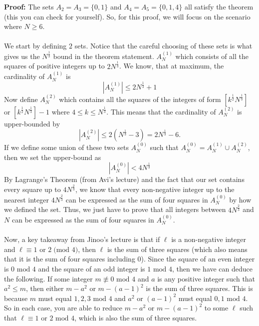 \begin{boxedsection}
    \textbf{Proof:} The sets $A_2 = A_3 = \{0, 1\}$ and $A_4 = A_5 = \{0,1,4\}$ all satisfy the theorem (this you can check for yourself). So, for this proof, we will focus on the scenario where $N \geq 6$. \\
    \\
    We start by defining $2$ sets. Notice that the careful choosing of these sets is what gives us the $N^{\frac{1}{3}}$ bound in the theorem statement. $A_N^{(1)}$ which consists of all the squares of positive integers up to $2N^{\frac{1}{3}}$. We know, that at maximum, the cardinality of $A_N^{(1)}$ is
    $$
    |A_N^{(1)}| \leq 2N^{\frac{1}{3}} + 1
    $$
Now define $A^{(2)}_N$ which contains all the squares of the integers of form $\left[k^{\frac{1}{2}}N^{\frac{1}{3}}\right]$ or $\left[k^{\frac{1}{2}}N^{\frac{1}{3}}\right] - 1$ where $4 \leq k \leq N^{\frac{1}{3}}$. This means that the cardinality of $A^{(2)}_N$ is upper-bounded by
    $$
    |A^{(2)}_N| \leq 2(N^{\frac{1}{3}} - 3) = 2N^{\frac{1}{3}} - 6. 
    $$
    If we define some union of these two sets $A^{(0)}_N$ such that $A^{(0)}_N = A^{(1)}_N \cup A^{(2)}_N$, then we set the upper-bound as
$$
    |A^{(0)}_N| < 4N^{\frac{1}{3}}
$$
By Lagrange's Theorem (from Avi's lecture) and the fact that our set contains every square up to $4N^{\frac{2}{3}}$, we know that every non-negative integer up to the nearest integer $4N^{\frac{2}{3}}$ can be expressed as the sum of four squares in $A_N^{(0)}$ by how we defined the set. Thus, we just have to prove that all integers between $4N^{\frac{2}{3}}$ and $N$ can be expressed as the sum of four squares in $A_N^{(0)}$.\\
\\
Now, a key takeaway from Jinoo's lecture is that if $\ell$ is a non-negative integer and $\ell \equiv 1 \text{ or } 2 \;\text{(mod 4)}$, then $\ell$ is the sum of three squares (which also means that it is the sum of four squares including $0$). Since the square of an even integer is $0 \text{ mod } 4$ and the square of an odd integer is $1 \text{ mod } 4$, then we have can deduce the following. If some integer $m \nequiv 0 \text{ mod } 4$ and $a$ is any positive integer such that $a^2 \leq m$, then either $m-a^2$ or $m-(a-1)^2$ is the sum of three squares. This is because $m$ must equal $1,2,3 \text{ mod }4$ and $a^2$ or $(a-1)^2$ must equal $0,1 \text{ mod } 4$. So in each case, you are able to reduce $m-a^2$ or $m-(a-1)^2$ to some $\ell$ such that $\ell \equiv 1 \text{ or } 2 \text{ mod } 4$, which is also the sum of three squares.\\

\end{boxedsection}

